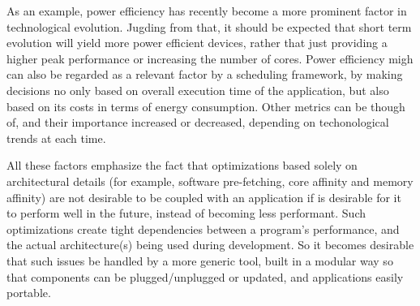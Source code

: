 \documentclass[main.tex]{subfiles}
\begin{document}
As an example, power efficiency has recently become a more prominent factor in technological evolution. Jugding from that, it should be expected that short term evolution will yield more power efficient devices, rather that just providing a higher peak performance or increasing the number of cores. Power efficiency migh can also be regarded as a relevant factor by a scheduling framework, by making decisions no only based on overall execution time of the application, but also based on its costs in terms of energy consumption.
Other metrics can be though of, and their importance increased or decreased, depending on techonological trends at each time.

All these factors emphasize the fact that optimizations based solely on architectural details (for example, software pre-fetching, core affinity and memory affinity) are not desirable to be coupled with an application if is desirable for it to perform well in the future, instead of becoming less performant. Such optimizations create tight dependencies between a program's performance, and the actual architecture(s) being used during development. So it becomes desirable that such issues be handled by a more generic tool, built in a modular way so that components can be plugged/unplugged or updated, and applications easily portable.
\end{document}
